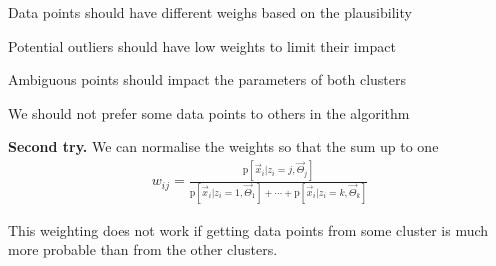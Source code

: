 \documentclass[landscape,footrule]{foils}
\newcommand{\pd}[1]{\mathrm{p}[#1]}
\begin{document}

Data points should have different weighs based on the plausibility 
\begin{triangles}
\item Potential outliers should have low weights to limit their impact
\item Ambiguous points should impact the parameters of both clusters 
\item We should not prefer some data points to others in the algorithm
\end{triangles} 
\vspace*{1cm}

\textbf{Second try.}
We can normalise the weights so that the sum up to one
\begin{align*}
w_{ij}=\frac{\pd{\vec{x}_i|z_i=j,\vec{\Theta}_j}}{\pd{\vec{x}_i|z_i=1,\vec{\Theta}_1}+\cdots+\pd{\vec{x}_i|z_i=k,\vec{\Theta}_k}}
\end{align*}

This weighting does not work if getting data points from some cluster is much more probable than from the other clusters.
\vspace*{-1cm} 



\end{document}
